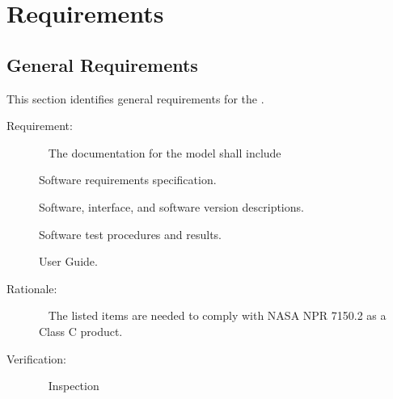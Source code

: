 \documentclass[twoside,11pt,titlepage]{report}
\begin{document}
\chapter{Requirements}\label{sec:reqts}

\section{General Requirements}\label{sec:general_reqts}

This section identifies general requirements for the \TrickHLA.


\label{reqt:documentation}
\begin{description}
  \item[Requirement:]\ \newline
    The documentation for the model shall include

    \subrequirement{}
    \label{reqt:reqts_doc}
      Software requirements specification.

    \subrequirement{}
    \label{reqt:design_doc}
      Software, interface, and software version descriptions.

    \subrequirement{}
    \label{reqt:test_doc}
      Software test procedures and results.

    \subrequirement{}
    \label{reqt:user_doc}
      User Guide.

  \item[Rationale:]\ \newline
    The listed items are needed to comply with NASA NPR 7150.2
    as a Class C product.

  \item[Verification:]\ \newline
    Inspection
\end{description}
\end{document}
